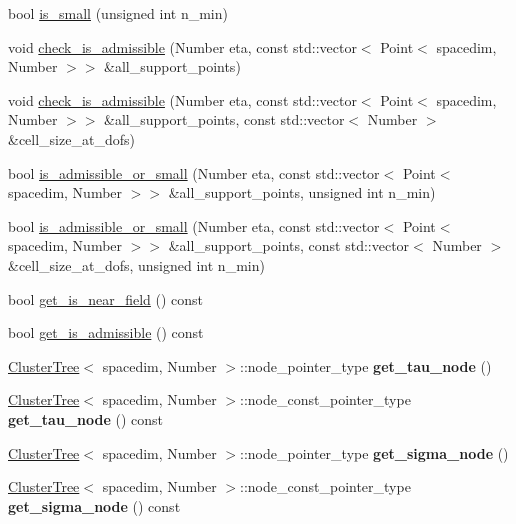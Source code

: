 \begin{DoxyCompactItemize}
\item 
bool \hyperlink{classBlockCluster_adb6edc09ec2c579677e0532644b9f57d}{is\+\_\+small} (unsigned int n\+\_\+min)
\item 
void \hyperlink{classBlockCluster_a1f56a4b4d2c24fe8e78a954e13134ee1}{check\+\_\+is\+\_\+admissible} (Number eta, const std\+::vector$<$ Point$<$ spacedim, Number $>$$>$ \&all\+\_\+support\+\_\+points)
\item 
void \hyperlink{classBlockCluster_a79e83ccbdb52032b6b2d83e7d095e62d}{check\+\_\+is\+\_\+admissible} (Number eta, const std\+::vector$<$ Point$<$ spacedim, Number $>$$>$ \&all\+\_\+support\+\_\+points, const std\+::vector$<$ Number $>$ \&cell\+\_\+size\+\_\+at\+\_\+dofs)
\item 
bool \hyperlink{classBlockCluster_a3d1d12357cac0ff4df90fd576c5f2aa0}{is\+\_\+admissible\+\_\+or\+\_\+small} (Number eta, const std\+::vector$<$ Point$<$ spacedim, Number $>$$>$ \&all\+\_\+support\+\_\+points, unsigned int n\+\_\+min)
\item 
bool \hyperlink{classBlockCluster_a620554d7d66beaf4dc38f166bc6dceed}{is\+\_\+admissible\+\_\+or\+\_\+small} (Number eta, const std\+::vector$<$ Point$<$ spacedim, Number $>$$>$ \&all\+\_\+support\+\_\+points, const std\+::vector$<$ Number $>$ \&cell\+\_\+size\+\_\+at\+\_\+dofs, unsigned int n\+\_\+min)
\item 
bool \hyperlink{classBlockCluster_ac263721e28921a6177a025139745fe8d}{get\+\_\+is\+\_\+near\+\_\+field} () const
\item 
bool \hyperlink{classBlockCluster_a792554d843db2dfb996a1d1086e9178b}{get\+\_\+is\+\_\+admissible} () const
\item 
\mbox{\label{classBlockCluster_a115554141628dd4d4c43000a17d0de87}} 
\hyperlink{classClusterTree}{Cluster\+Tree}$<$ spacedim, Number $>$\+::node\+\_\+pointer\+\_\+type {\bfseries get\+\_\+tau\+\_\+node} ()
\item 
\mbox{\label{classBlockCluster_a0eee0e86e3f4efaace6ca1e1ae799b5e}} 
\hyperlink{classClusterTree}{Cluster\+Tree}$<$ spacedim, Number $>$\+::node\+\_\+const\+\_\+pointer\+\_\+type {\bfseries get\+\_\+tau\+\_\+node} () const
\item 
\mbox{\label{classBlockCluster_afb94252b60aeb16cba76c682beece9e5}} 
\hyperlink{classClusterTree}{Cluster\+Tree}$<$ spacedim, Number $>$\+::node\+\_\+pointer\+\_\+type {\bfseries get\+\_\+sigma\+\_\+node} ()
\item 
\mbox{\label{classBlockCluster_af5d7b4b0154ec0f5a99c6c3a7119ac52}} 
\hyperlink{classClusterTree}{Cluster\+Tree}$<$ spacedim, Number $>$\+::node\+\_\+const\+\_\+pointer\+\_\+type {\bfseries get\+\_\+sigma\+\_\+node} () const
\end{DoxyCompactItemize}

